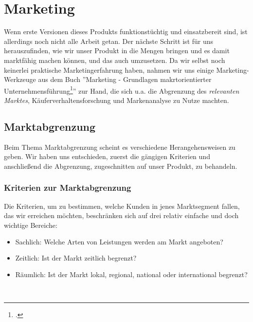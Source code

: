 \section{Marketing}
Wenn erste Versionen dieses Produkts funktionstüchtig und einsatzbereit sind, ist allerdings noch nicht alle Arbeit getan. Der nächste Schritt ist für uns herauszufinden, wie wir unser Produkt in die Mengen bringen und es damit marktfähig machen können, und das auch umzusetzen. Da wir selbst noch keinerlei praktische Marketingerfahrung haben, nahmen wir uns einige Marketing-Werkzeuge aus dem Buch ''Marketing - Grundlagen makrtorientierter Unternehmensführung\footcite{book_marketing}'' zur Hand, die sich u.a. die Abgrenzung des \textit{relevanten Marktes}, Käuferverhaltensforschung und Markenanalyse zu Nutze machten.\\

\subsection{Marktabgrenzung}
Beim Thema Marktabgrenzung scheint es verschiedene Herangehensweisen zu geben. Wir haben uns entschieden, zuerst die gängigen Kriterien und anschließend die Abgrenzung, zugeschnitten auf unser Produkt, zu behandeln.\\

\subsubsection{Kriterien zur Marktabgrenzung}
Die Kriterien, um zu bestimmen, welche Kunden in jenes Marktsegment fallen, das wir erreichen möchten, beschränken sich auf drei relativ einfache und doch wichtige Bereiche:\\

\begin{itemize}
	\item Sachlich: Welche Arten von Leistungen werden am Markt angeboten?
	\item Zeitlich: Ist der Markt zeitlich begrenzt?
	\item Räumlich: Ist der Markt lokal, regional, national oder international begrenzt?
\end{itemize}
\ \\

